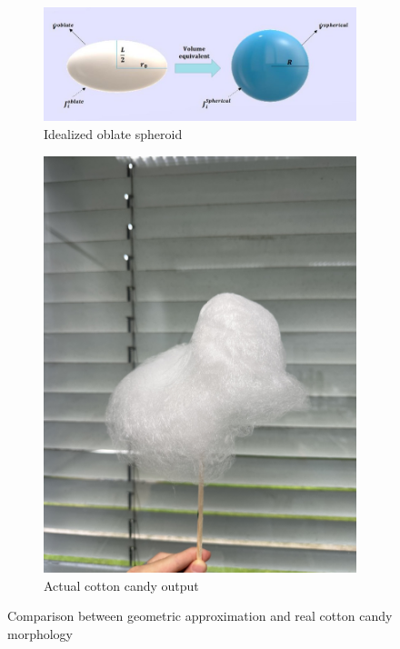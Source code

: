 \begin{figure}[H]
    \centering
    \begin{subfigure}[b]{0.45\textwidth}
        \centering
        \includegraphics[width=\textwidth]{figures/Schematic-diagram-of-the-oblate-spheroid-and-its-volume-equivalent-sphere.jpg}
        \caption{Idealized oblate spheroid}
        \label{fig:oblate-spheroid}
    \end{subfigure}
    \hfill
    \begin{subfigure}[b]{0.45\textwidth}
        \centering
        \includegraphics[width=\textwidth]{figures/firstCC.jpeg}
        \caption{Actual cotton candy output}
        \label{fig:cotton-candy}
    \end{subfigure}
    \caption{Comparison between geometric approximation and real cotton candy morphology}
    \label{fig:volume-comparison}
\end{figure}


